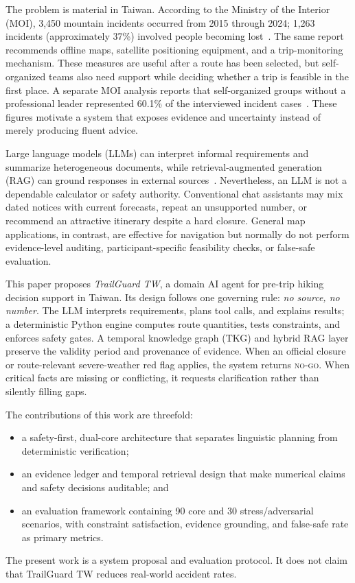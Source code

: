 \documentclass[conference]{IEEEtran}
\begin{document}
The problem is material in Taiwan. According to the Ministry of the Interior
(MOI), 3,450 mountain incidents occurred from 2015 through 2024; 1,263
incidents (approximately 37\%) involved people becoming lost~\cite{moi2025}.
The same report recommends offline maps, satellite positioning equipment, and
a trip-monitoring mechanism. These measures are useful after a route has been
selected, but self-organized teams also need support while deciding whether a
trip is feasible in the first place. A separate MOI analysis reports that
self-organized groups without a professional leader represented 60.1\% of the
interviewed incident cases~\cite{moi2025summer}. These figures motivate a
system that exposes evidence and uncertainty instead of merely producing
fluent advice.

Large language models (LLMs) can interpret informal requirements and summarize
heterogeneous documents, while retrieval-augmented generation (RAG) can ground
responses in external sources~\cite{lewis2020rag}. Nevertheless, an LLM is not
a dependable calculator or safety authority. Conventional chat assistants may
mix dated notices with current forecasts, repeat an unsupported number, or
recommend an attractive itinerary despite a hard closure. General map
applications, in contrast, are effective for navigation but normally do not
perform evidence-level auditing, participant-specific feasibility checks, or
false-safe evaluation.

This paper proposes \emph{TrailGuard TW}, a domain AI agent for pre-trip hiking
decision support in Taiwan. Its design follows one governing rule:
\emph{no source, no number}. The LLM interprets requirements, plans tool calls,
and explains results; a deterministic Python engine computes route quantities,
tests constraints, and enforces safety gates. A temporal knowledge graph (TKG)
and hybrid RAG layer preserve the validity period and provenance of evidence.
When an official closure or route-relevant severe-weather red flag applies, the
system returns \textsc{no-go}. When critical facts are missing or conflicting,
it requests clarification rather than silently filling gaps.

The contributions of this work are threefold:
\begin{itemize}
    \item a safety-first, dual-core architecture that separates linguistic
    planning from deterministic verification;
    \item an evidence ledger and temporal retrieval design that make numerical
    claims and safety decisions auditable; and
    \item an evaluation framework containing 90 core and 30
    stress/adversarial scenarios, with constraint satisfaction, evidence
    grounding, and false-safe rate as primary metrics.
\end{itemize}
The present work is a system proposal and evaluation protocol. It does not
claim that TrailGuard TW reduces real-world accident rates.
\end{document}
